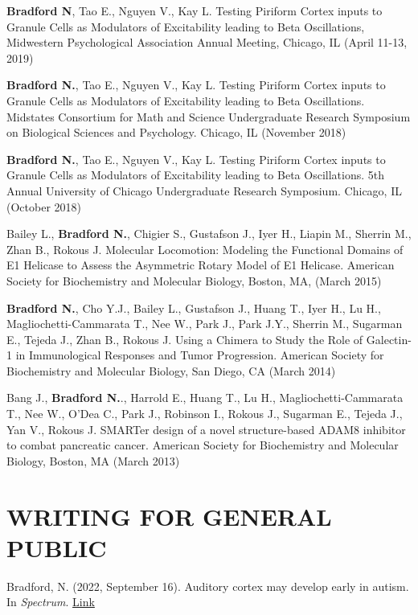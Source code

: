 \documentclass[margin, 10pt]{res} %
\begin{document}
\begin{resume}
\textbf{Bradford N}, Tao E., Nguyen V., Kay L. Testing Piriform Cortex inputs to Granule Cells as Modulators of Excitability leading to Beta Oscillations, Midwestern Psychological Association Annual Meeting, Chicago, IL (April 11-13, 2019)

\textbf{Bradford N.}, Tao E., Nguyen V., Kay L. Testing Piriform Cortex inputs to Granule Cells as Modulators of Excitability leading to Beta Oscillations. Midstates Consortium for Math and Science Undergraduate Research Symposium on Biological Sciences and Psychology. Chicago, IL (November 2018) 

\textbf{Bradford N.}, Tao E., Nguyen V., Kay L. Testing Piriform Cortex inputs to Granule Cells as Modulators of Excitability leading to Beta Oscillations. 5th Annual University of Chicago Undergraduate Research Symposium. Chicago, IL (October 2018)

Bailey L., \textbf{Bradford N.}, Chigier S., Gustafson J., Iyer H., Liapin M., Sherrin M., Zhan B., Rokous J. Molecular Locomotion: Modeling the Functional Domains of E1 Helicase to Assess the Asymmetric Rotary Model of E1 Helicase. American Society for Biochemistry and Molecular Biology, Boston, MA, (March 2015)

\textbf{Bradford N.}, Cho Y.J., Bailey L., Gustafson J., Huang T., Iyer H., Lu H., Magliochetti-Cammarata T., Nee W., Park J., Park J.Y., Sherrin M., Sugarman E., Tejeda J., Zhan B., Rokous J. Using a Chimera to Study the Role of Galectin-1 in Immunological Responses and Tumor Progression. American Society for Biochemistry and Molecular Biology, San Diego, CA (March 2014)

Bang J., \textbf{Bradford N.}., Harrold E., Huang T., Lu H., Magliochetti-Cammarata T., Nee W., O'Dea C., Park J., Robinson I., Rokous J., Sugarman E., Tejeda J., Yan V., Rokous J. SMARTer design of a novel structure-based ADAM8 inhibitor to combat pancreatic cancer. American Society for Biochemistry and Molecular Biology, Boston, MA (March 2013)


\section{WRITING FOR GENERAL PUBLIC}

Bradford, N. (2022, September 16). Auditory cortex may develop early in autism. In {\sl Spectrum}. \href{https://www.spectrumnews.org/news/auditory-cortex-may-develop-early-in-autism/}{Link}


\end{resume}
\end{document}
